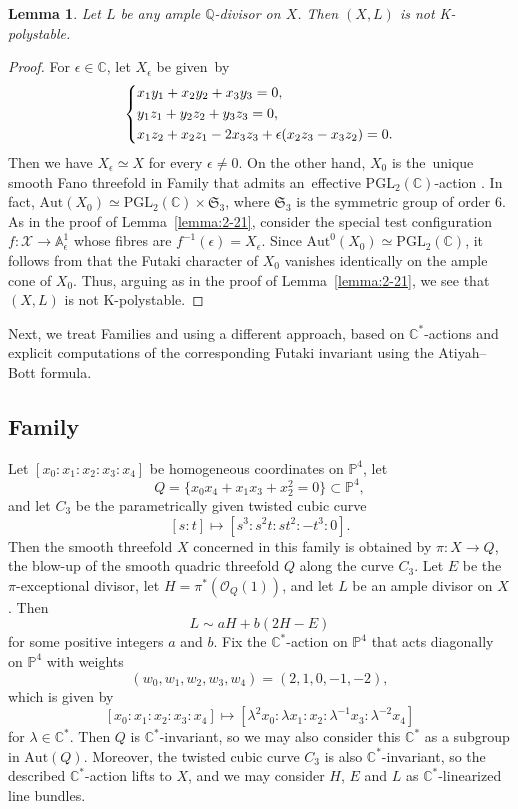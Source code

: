 \documentclass[12pt]{amsart}
\newtheorem{lemma}[theorem]{Lemma}
\theoremstyle{definition}
\theoremstyle{remark}
\newcommand{\C}{\mathbb{C}}
\newcommand{\PP}{\mathbb{P}}
\begin{document}
\begin{lemma}
\label{lemma:3-13}
Let $L$ be any ample $\mathbb{Q}$-divisor on $X$. Then $(X,L)$ is not K-polystable.
\end{lemma}

\begin{proof}
For $\epsilon\in\mathbb{C}$, let $X_{\epsilon}$ be given~by
$$
\left\{\aligned
&x_1y_1+x_2y_2+x_3y_3=0,\\
&y_1z_1+y_2z_2+y_3z_3=0,\\
&x_1z_2+x_2z_1-2x_3z_3+\epsilon(x_2z_3-x_3z_2)=0.
\endaligned
\right.
$$
Then we have $X_{\epsilon}\simeq X$ for every $\epsilon\ne 0$.
On the other hand, $X_0$ is the~unique smooth Fano threefold in Family  that admits an~effective $\mathrm{PGL}_2(\mathbb{C})$-action \cite{Book}.
In fact, $\mathrm{Aut}(X_0)\simeq\mathrm{PGL}_2(\mathbb{C})\times\mathfrak{S}_3$, where $\mathfrak{S}_3$ is the symmetric group of order $6$.
As in the proof of Lemma~\ref{lemma:2-21}, consider the special test configuration $f\colon \mathcal{X}\to\mathbb{A}^1_{\epsilon}$ whose fibres are $f^{-1}(\epsilon)=X_{\epsilon}$.
Since $\mathrm{Aut}^0(X_0)\simeq\mathrm{PGL}_2(\mathbb{C})$, it follows from \cite{Futaki,Mabuchi,PhongSturm} that the Futaki character of $X_0$ vanishes identically on the ample cone of $X_0$. Thus, arguing as in the proof of Lemma~\ref{lemma:2-21}, we see that $(X,L)$ is not K-polystable.
\end{proof}

Next, we treat Families  and  using a different approach, based on $\mathbb{C}^*$-actions and explicit computations of the corresponding Futaki invariant using the Atiyah--Bott formula. 

\subsection{Family }
\label{subsection:2-26}
Let $[x_0:x_1:x_2:x_3:x_4]$ be homogeneous coordinates on $\mathbb{P}^4$, let
$$
Q=\{x_0x_4+x_1x_3+x_2^2=0\}\subset \PP^4,
$$
and let $C_3$ be the parametrically given twisted cubic curve
$$
[s:t]\mapsto [s^3:s^2t:st^2:-t^3:0].
$$
Then the smooth threefold $X$ concerned in this family
is obtained by $\pi\colon X\to Q$, the blow-up of the smooth quadric threefold $Q$ along the curve $C_3$.
Let $E$ be the~$\pi$-exceptional divisor, let $H=\pi^*(\mathcal{O}_{Q}(1))$, and let $L$ be an ample divisor on $X$. Then
$$
L\sim aH+b(2H-E)
$$
for some positive integers $a$ and $b$.
Fix the $\C^*$-action on $\PP^4$ that acts diagonally on $\PP^4$ with weights
$$
(w_0,w_1,w_2,w_3,w_4)=(2,1,0,-1,-2),
$$
which is given by
$$
[x_0:x_1:x_2:x_3:x_4]\mapsto [\lambda^{2}x_0:\lambda x_1:x_2:\lambda^{-1}x_3:\lambda^{-2}x_4]
$$
for $\lambda\in\mathbb{C}^*$. Then $Q$ is $\C^*$-invariant, so we may also consider this $\mathbb{C}^*$ as a subgroup in $\mathrm{Aut}(Q)$.
Moreover, the twisted cubic curve $C_3$ is also $\C^*$-invariant, so the described $\C^*$-action lifts to $X$,
and we may consider $H$, $E$ and $L$ as $\mathbb{C}^*$-linearized line bundles.
\end{document}
